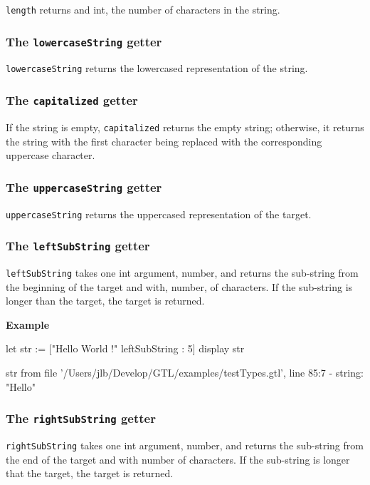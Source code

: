 \documentclass[10pt,openright,twosides]{report}
\newcommand{\gtlarg}[1]{{\footnotesize\ttfamily\colorbox{light-blue}{#1}}}
\newcommand{\gtlinline}[1]{\colorbox{light-blue}{\lstinline[language=gtl]{#1}}}
\newcommand{\example}{\vspace{.75em}\noindent\textbf{Example}\vspace{0em}}
\begin{document}
\gtlinline{length} returns and int, the number of characters in the string.

\subsubsection{The \texttt{lowercaseString} getter}

\gtlinline{lowercaseString} returns the lowercased representation of the string.

\subsubsection{The \texttt{capitalized} getter}

If the string is empty, \gtlinline{capitalized} returns the empty string; otherwise, it returns the string with the first character being replaced with the corresponding uppercase character.

\subsubsection{The \texttt{uppercaseString} getter}

\gtlinline{uppercaseString} returns the uppercased representation of the target.

\subsubsection{The \texttt{leftSubString} getter}

\gtlinline{leftSubString} takes one int argument, \gtlarg{number}, and returns the sub-string from the beginning of the target and with, \gtlarg{number}, of characters. If the sub-string is longer than the target, the target is returned.

\example
\begin{gtl}
let str := ["Hello World !" leftSubString : 5]
display str
\end{gtl}
\begin{console}
str from file '/Users/jlb/Develop/GTL/examples/testTypes.gtl', line 85:7
  - string: "Hello"
\end{console}

\subsubsection{The \texttt{rightSubString} getter}

\gtlinline{rightSubString} takes one int argument, \gtlarg{number}, and returns the sub-string from the end of the target and with \gtlarg{number} of characters. If the sub-string is longer that the target, the target is returned.
\end{document}
